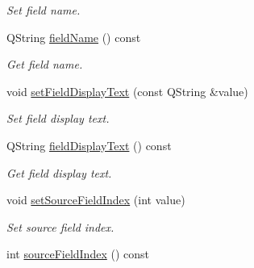 \begin{DoxyCompactItemize}
\begin{DoxyCompactList}\small\item\em Set field name. \end{DoxyCompactList}\item 
\hypertarget{classmdt_field_map_item_aae5a1bb7f4e3177688b96cac29887ef9}{
QString \hyperlink{classmdt_field_map_item_aae5a1bb7f4e3177688b96cac29887ef9}{fieldName} () const }
\label{classmdt_field_map_item_aae5a1bb7f4e3177688b96cac29887ef9}

\begin{DoxyCompactList}\small\item\em Get field name. \end{DoxyCompactList}\item 
\hypertarget{classmdt_field_map_item_a6a4785553c29487a6de07eaca54d5d31}{
void \hyperlink{classmdt_field_map_item_a6a4785553c29487a6de07eaca54d5d31}{setFieldDisplayText} (const QString \&value)}
\label{classmdt_field_map_item_a6a4785553c29487a6de07eaca54d5d31}

\begin{DoxyCompactList}\small\item\em Set field display text. \end{DoxyCompactList}\item 
\hypertarget{classmdt_field_map_item_a50eae227257c34aabc4cc3e08a75e8d7}{
QString \hyperlink{classmdt_field_map_item_a50eae227257c34aabc4cc3e08a75e8d7}{fieldDisplayText} () const }
\label{classmdt_field_map_item_a50eae227257c34aabc4cc3e08a75e8d7}

\begin{DoxyCompactList}\small\item\em Get field display text. \end{DoxyCompactList}\item 
\hypertarget{classmdt_field_map_item_a6417b5e9d5cabba4744550e69869b0da}{
void \hyperlink{classmdt_field_map_item_a6417b5e9d5cabba4744550e69869b0da}{setSourceFieldIndex} (int value)}
\label{classmdt_field_map_item_a6417b5e9d5cabba4744550e69869b0da}

\begin{DoxyCompactList}\small\item\em Set source field index. \end{DoxyCompactList}\item 
\hypertarget{classmdt_field_map_item_a008cc7bc43612f6df87ba62e14aed6ab}{
int \hyperlink{classmdt_field_map_item_a008cc7bc43612f6df87ba62e14aed6ab}{sourceFieldIndex} () const }
\label{classmdt_field_map_item_a008cc7bc43612f6df87ba62e14aed6ab}


\end{DoxyCompactItemize}
